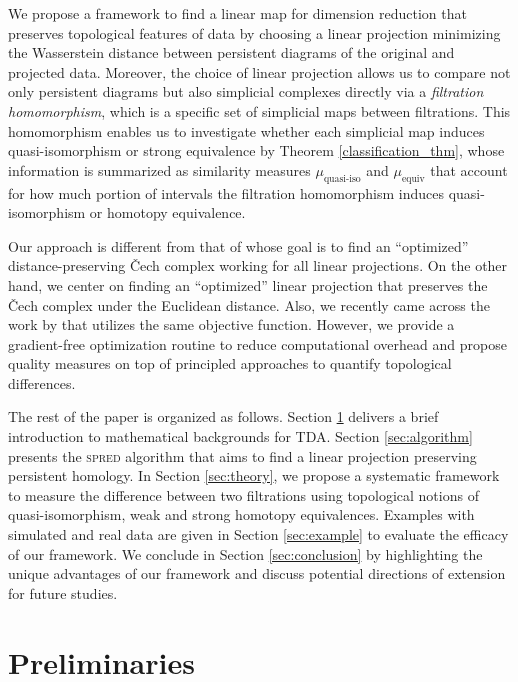 \documentclass[11pt]{article}
\begin{document}
We propose a framework to find a linear map for dimension reduction that preserves topological features of data by choosing a linear projection minimizing the Wasserstein distance between persistent diagrams of the original and projected data. Moreover, the choice of linear projection allows us to compare not only persistent diagrams but also simplicial complexes directly via a \emph{filtration homomorphism}, which is a specific set of simplicial maps between filtrations. This homomorphism enables us to investigate whether each simplicial map induces quasi-isomorphism or strong equivalence by Theorem \ref{classification_thm}, whose information is summarized as similarity measures $\mu_{\operatorname{quasi-iso}}$ and $\mu_{\operatorname{equiv}}$ that account for how much portion of intervals the filtration homomorphism induces quasi-isomorphism or homotopy equivalence. 

Our approach is different from that of \cite{aryaetal} whose goal is to find an ``optimized'' distance-preserving \v{C}ech complex working for all linear projections. On the other hand, we center on finding an ``optimized'' linear projection that preserves the \v{C}ech complex under the Euclidean distance. Also, we recently came across the work by \cite{kachan_persistent_2020} that utilizes the same objective function. However, we provide a gradient-free optimization routine to reduce computational overhead and propose quality measures on top of principled approaches to quantify topological differences.



The rest of the paper is organized as follows. Section \ref{sec:prelim} delivers a brief introduction to mathematical backgrounds for TDA. Section \ref{sec:algorithm} presents the \textsc{spred} algorithm that aims to find a linear projection preserving persistent homology. In Section \ref{sec:theory}, we propose a systematic framework to measure the difference between two filtrations using topological notions of quasi-isomorphism, weak and strong homotopy equivalences. Examples with simulated and real data are given in Section \ref{sec:example} to evaluate the efficacy of our framework. We conclude in Section \ref{sec:conclusion} by highlighting the unique advantages of our framework and discuss potential directions of extension for future studies.


\section{Preliminaries}\label{sec:prelim}
\end{document}
